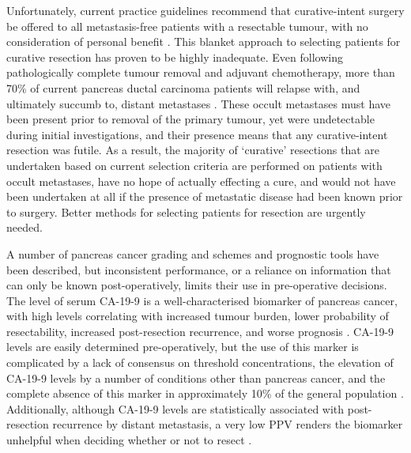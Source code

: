 \documentclass[dissertation.tex]{subfiles}
\begin{document}
Unfortunately, current practice guidelines recommend that curative-intent surgery be offered to all metastasis-free patients with a resectable tumour, with no consideration of personal benefit \cite{Editors2015}.  This blanket approach to selecting patients for curative resection has proven to be highly inadequate.  Even following pathologically complete tumour removal and adjuvant chemotherapy, more than 70\% of current pancreas ductal carcinoma patients will relapse with, and ultimately succumb to, distant metastases \cite{Barugola2007}.  These occult metastases must have been present prior to removal of the primary tumour, yet were undetectable during initial investigations, and their presence means that any curative-intent resection was futile.  As a result, the majority of `curative' resections that are undertaken based on current selection criteria are performed on patients with occult metastases, have no hope of actually effecting a cure, and would not have been undertaken at all if the presence of metastatic disease had been known prior to surgery.  Better methods for selecting patients for resection are urgently needed.


A number of pancreas cancer grading and schemes and prognostic tools have been described, but inconsistent performance, or a reliance on information that can only be known post-operatively, limits their use in pre-operative decisions.  The level of serum \gls{CA-19-9} is a well-characterised biomarker of pancreas cancer, with high levels correlating with increased tumour burden, lower probability of resectability, increased post-resection recurrence, and worse prognosis \cite{Kim2011, Ballehaninna2012, Barugola2007, Lundin1994}.  \Gls{CA-19-9} levels are easily determined pre-operatively, but the use of this marker is complicated by a lack of consensus on threshold concentrations, the elevation of \gls{CA-19-9} levels by a number of conditions other than pancreas cancer, and the complete absence of this marker in approximately 10\% of the general population \cite{Ballehaninna2012}.  Additionally, although \gls{CA-19-9} levels are statistically associated with post-resection recurrence by distant metastasis, a very low \gls{PPV} renders the biomarker unhelpful when deciding whether or not to resect \cite{Kim2011}.
\end{document}
